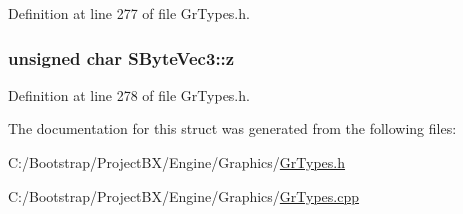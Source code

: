 Definition at line 277 of file GrTypes.h.\hypertarget{struct_s_byte_vec3_384e36ccc97f776513293e7132ac1338}{
\subsubsection[{z}]{\setlength{\rightskip}{0pt plus 5cm}unsigned char {\bf SByteVec3::z}}}
\label{struct_s_byte_vec3_384e36ccc97f776513293e7132ac1338}




Definition at line 278 of file GrTypes.h.

The documentation for this struct was generated from the following files:\begin{CompactItemize}
\item 
C:/Bootstrap/ProjectBX/Engine/Graphics/\hyperlink{_gr_types_8h}{GrTypes.h}\item 
C:/Bootstrap/ProjectBX/Engine/Graphics/\hyperlink{_gr_types_8cpp}{GrTypes.cpp}\end{CompactItemize}
